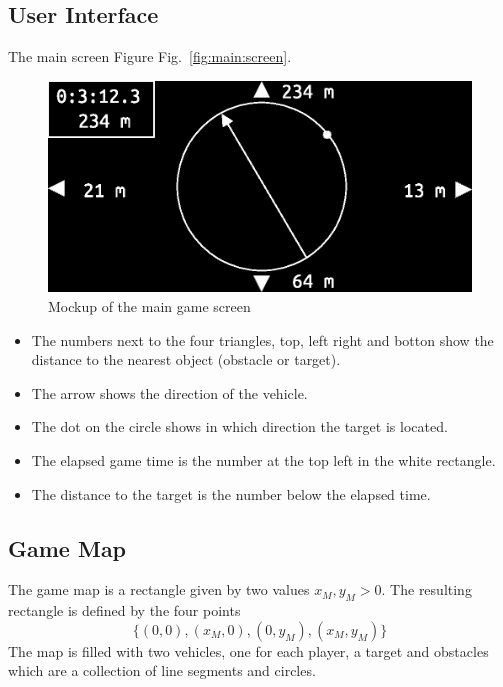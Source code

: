 \documentclass[11pt]{article}
\newcommand{\figref}[1]{Fig.~\eqref{#1}}
\begin{document}
\subsection{User Interface}
\label{sec:user:interface}
The main screen Figure \figref{fig:main:screen}.
\begin{figure}
    \includegraphics[width=\textwidth]{screen.eps}
\caption{Mockup of the main game screen}\label{fig:main:screen}
\end{figure}
\begin{itemize}
    \item The numbers next to the four triangles, top, left right and botton 
        show the distance to the nearest object (obstacle or target). 
    \item The arrow shows the direction of the vehicle. 
    \item The dot on the circle shows in which direction the target is 
        located.
    \item The elapsed game time is the number at the top left in the white
        rectangle.
    \item The distance to the target is the number below the elapsed time.
\end{itemize}

\subsection{Game Map}
\label{sec:game:map}
The game map is a rectangle given by two values $x_M, y_M > 0$. The resulting
rectangle is defined by the four points
\begin{equation*}
    \{(0,0), (x_M, 0), (0, y_M), (x_M, y_M)\} 
\end{equation*}
The map is filled with two vehicles, one for each player, a target and
obstacles which are a collection of line segments and circles.
\end{document}
